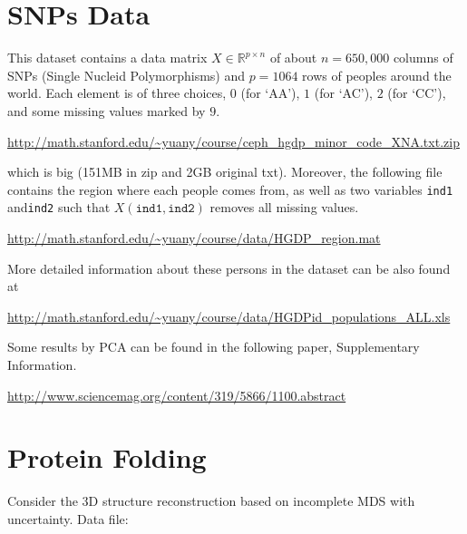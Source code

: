 \documentclass[11pt]{article}
\def\R{{\mathbb R}}
\begin{document}
%
%
%
%
%

\section{SNPs Data}
 This dataset contains a data matrix $X\in \R^{p\times n}$ of about $n=650,000$ columns of SNPs (Single Nucleid Polymorphisms) and $p=1064$ rows of peoples around the world. Each element is of three choices, $0$ (for `AA'), $1$ (for `AC'), $2$ (for `CC'), and some missing values marked by $9$. 

\url{http://math.stanford.edu/~yuany/course/ceph_hgdp_minor_code_XNA.txt.zip}

\noindent which is big (151MB in zip and 2GB original txt). Moreover, the following file contains the region where each people comes from, as well as two variables {\texttt{ind1}} and{\texttt{ind2}} such that $X({\texttt{ind1}},{\texttt{ind2}})$ removes all missing values. 

\url{http://math.stanford.edu/~yuany/course/data/HGDP_region.mat}

\noindent More detailed information about these persons in the dataset can be also found at

\url{http://math.stanford.edu/~yuany/course/data/HGDPid_populations_ALL.xls}

Some results by PCA can be found in the following paper, Supplementary Information. 

\url{http://www.sciencemag.org/content/319/5866/1100.abstract}

\section{Protein Folding} 
Consider the 3D structure reconstruction based on incomplete MDS with uncertainty. Data file: 
\end{document}
